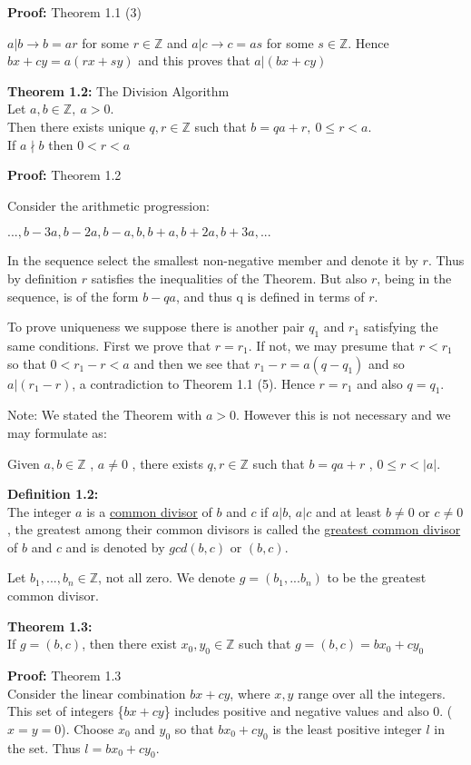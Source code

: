 \documentclass[a4paper]{article}
\begin{document}
\textbf{Proof:} Theorem 1.1 (3)

$a|b \rightarrow b=ar$ for some $r\in \mathbb{Z}$ and $a|c \rightarrow c=as$ for some $s\in \mathbb{Z}$. Hence $bx+cy=a(rx+sy)$ and this proves that $a|(bx+cy)$


\textbf{Theorem 1.2:} The Division Algorithm\\
Let $a,b\in\mathbb{Z},\ a>0$.\\
Then there exists unique $q,r\in\mathbb{Z}$ such that $b=qa+r,\ 0\leq r<a$.\\
If $a\nmid b$ then $0<r<a$

\textbf{Proof:} Theorem 1.2

Consider the arithmetic progression:

$...,b-3a,b-2a,b-a,b,b+a,b+2a,b+3a,...$

In the sequence select the smallest non-negative member and denote it by $r$. Thus by definition $r$ satisfies the inequalities of the Theorem. But also $r$, being in the sequence, is of the form $b-qa$, and thus q is defined in terms of $r$.

To prove uniqueness we suppose there is another pair $q_1$ and $r_1$ satisfying the same conditions. First we prove that $r=r_1$. If not, we may presume that $r<r_1$ so that $0<r_1-r<a$ and then we see that $r_1-r=a(q-q_1)$ and so $a|(r_1-r)$, a contradiction to Theorem 1.1 (5). Hence $r=r_1$ and also $q=q_1$.

Note: We stated the Theorem with $a>0$. However this is not necessary and we may formulate as:

Given $a,b\in\mathbb{Z}$ , $a\neq 0$ , there exists $q,r\in\mathbb{Z}$ such that $b=qa+r$ , $0\leq r < |a|$.


\textbf{Definition 1.2:}\\
The integer $a$ is a \underline{common divisor} of $b$ and $c$ if $a|b$, $a|c$ and at least $b\neq0$ or $c\neq0$, the greatest among their common divisors is called the \underline{greatest common divisor} of $b$ and $c$ and is denoted by $gcd(b,c)$ or $(b,c)$.

Let $b_1,...,b_n\in\mathbb{Z}$, not all zero. We denote $g=(b_1,...b_n)$ to be the greatest common divisor.

\textbf{Theorem 1.3:}\\
If $g=(b,c)$, then there exist $x_0,y_0\in\mathbb{Z}$ such that $g=(b,c)=bx_0+cy_0$

\textbf{Proof:} Theorem 1.3\\
Consider the linear combination $bx+cy$, where $x,y$ range over all the integers. This set of integers \{$bx+cy$\} includes positive and negative values and also 0. ($x=y=0$). Choose $x_0$ and $y_0$ so that $bx_0+cy_0$ is the least positive integer $l$ in the set. Thus $l=bx_0+cy_0$.
\end{document}
